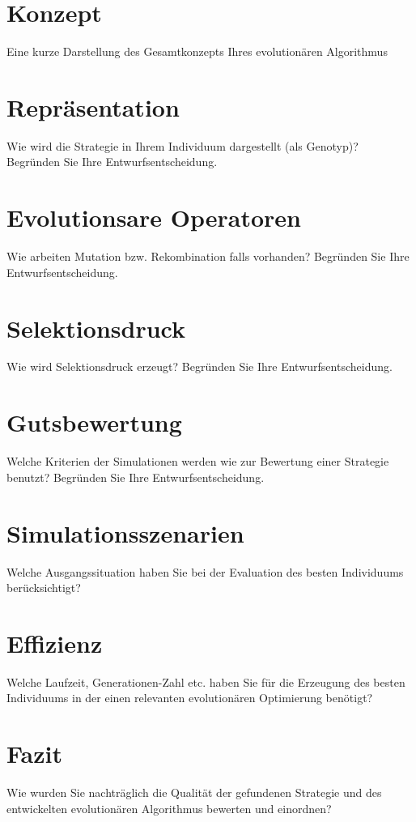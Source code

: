 \section{Konzept}
Eine kurze Darstellung des Gesamtkonzepts Ihres evolutionären Algorithmus 

\section{Repräsentation}
Wie wird die Strategie in Ihrem Individuum dargestellt (als Genotyp)? Begründen Sie Ihre Entwurfsentscheidung.

\section{Evolutionsare Operatoren}
Wie arbeiten Mutation bzw. Rekombination falls vorhanden? Begründen Sie Ihre Entwurfsentscheidung.

\section{Selektionsdruck}
Wie wird Selektionsdruck erzeugt? Begründen Sie Ihre Entwurfsentscheidung.

\section{Gutsbewertung}
Welche Kriterien der Simulationen werden wie zur Bewertung einer Strategie benutzt? Begründen Sie Ihre Entwurfsentscheidung.

\section{Simulationsszenarien}
Welche Ausgangssituation haben Sie bei der Evaluation des besten Individuums berücksichtigt?

\section{Effizienz}
Welche Laufzeit, Generationen-Zahl etc. haben Sie für die Erzeugung des besten Individuums in der einen relevanten evolutionären Optimierung benötigt?

\section{Fazit}
Wie wurden Sie nachträglich die Qualität der gefundenen Strategie und des entwickelten evolutionären Algorithmus bewerten und einordnen?
